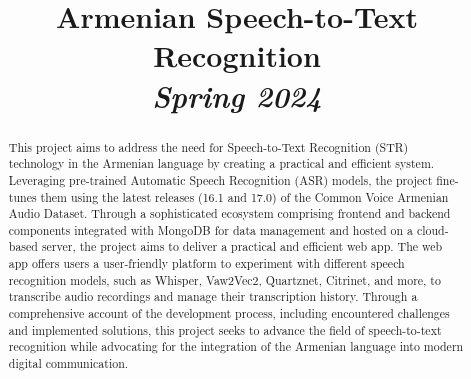 \documentclass[conference]{IEEEtran}
\begin{document}
\title{Armenian Speech-to-Text Recognition\\
\textit{Spring 2024}}


\author{
\and
{}
}

\maketitle

\begin{abstract}
This project aims to address the need for Speech-to-Text Recognition (STR) technology in the Armenian language by creating a practical and efficient system. Leveraging pre-trained Automatic Speech Recognition (ASR) models, the project fine-tunes them using the latest releases (16.1 and 17.0) of the Common Voice Armenian Audio Dataset. Through a sophisticated ecosystem comprising frontend and backend components integrated with MongoDB for data management and hosted on a cloud-based server, the project aims to deliver a practical and efficient web app. The web app offers users a user-friendly platform to experiment with different speech recognition models, such as Whisper, Vaw2Vec2, Quartznet, Citrinet, and more, to transcribe audio recordings and manage their transcription history. Through a comprehensive account of the development process, including encountered challenges and implemented solutions, this project seeks to advance the field of speech-to-text recognition while advocating for the integration of the Armenian language into modern digital communication.
\end{abstract}
\end{document}
